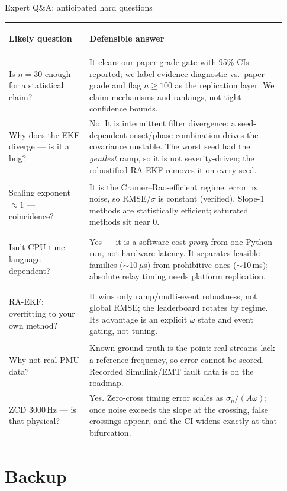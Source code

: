 \documentclass[aspectratio=169,10pt]{beamer}
\newif\ifbackupframes
\begin{document}
\begin{frame}{Expert Q\&A: anticipated hard questions}
\tiny
\renewcommand{\arraystretch}{1.18}
\setlength{\tabcolsep}{4pt}
\begin{tabular}{>{\bfseries\raggedright\arraybackslash}p{0.27\linewidth}>{\raggedright\arraybackslash}p{0.66\linewidth}}
\toprule
Likely question & Defensible answer \\
\midrule
Is $n=30$ enough for a statistical claim? & It clears our paper-grade gate with 95\% CIs reported; we label evidence diagnostic vs.\ paper-grade and flag $n\ge100$ as the replication layer. We claim mechanisms and rankings, not tight confidence bounds. \\
Why does the EKF diverge --- is it a bug? & No. It is intermittent filter divergence: a seed-dependent onset/phase combination drives the covariance unstable. The worst seed had the \emph{gentlest} ramp, so it is not severity-driven; the robustified RA-EKF removes it on every seed. \\
Scaling exponent $\approx 1$ --- coincidence? & It is the Cramer--Rao-efficient regime: error $\propto$ noise, so RMSE/$\sigma$ is constant (verified). Slope-1 methods are statistically efficient; saturated methods sit near 0. \\
Isn't CPU time language-dependent? & Yes --- it is a software-cost \emph{proxy} from one Python run, not hardware latency. It separates feasible families ($\sim$10\,$\mu$s) from prohibitive ones ($\sim$10\,ms); absolute relay timing needs platform replication. \\
RA-EKF: overfitting to your own method? & It wins only ramp/multi-event robustness, not global RMSE; the leaderboard rotates by regime. Its advantage is an explicit $\dot\omega$ state and event gating, not tuning. \\
Why not real PMU data? & Known ground truth is the point: real streams lack a reference frequency, so error cannot be scored. Recorded Simulink/EMT fault data is on the roadmap. \\
ZCD 3000\,Hz --- is that physical? & Yes. Zero-cross timing error scales as $\sigma_n/(A\omega)$; once noise exceeds the slope at the crossing, false crossings appear, and the CI widens exactly at that bifurcation. \\
\bottomrule
\end{tabular}
\end{frame}



\ifbackupframes
\appendix
\section{Backup}
\end{document}
